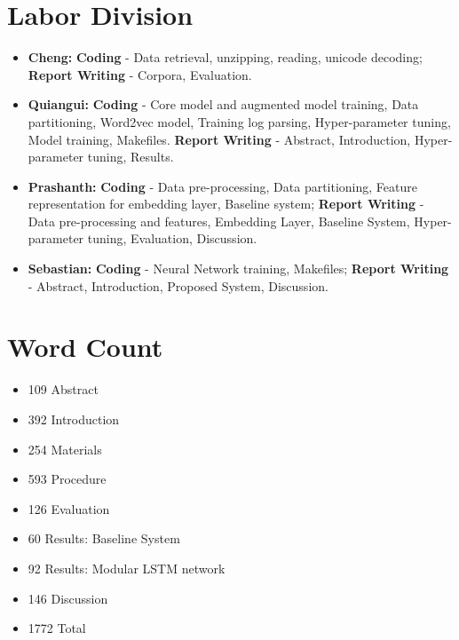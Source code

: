 \documentclass[12pt]{article}
\begin{document}
\newpage
\section{Labor Division}
\begin{itemize}
\item
  \textbf{Cheng:} \textbf{Coding} - Data retrieval, unzipping, reading, unicode decoding; \textbf{Report Writing} - Corpora, Evaluation.
\item
  \textbf{Quiangui:} \textbf{Coding} - Core model and augmented model training, Data partitioning, Word2vec model, Training log parsing, Hyper-parameter tuning, Model training, Makefiles. \textbf{Report Writing} - Abstract, Introduction, Hyper-parameter tuning, Results.
\item
  \textbf{Prashanth:} \textbf{Coding} - Data pre-processing, Data partitioning,  Feature representation for embedding layer, Baseline system; \textbf{Report Writing} - Data pre-processing and features, Embedding Layer, Baseline System, Hyper-parameter tuning, Evaluation, Discussion.
\item
  \textbf{Sebastian:} \textbf{Coding} - Neural Network training, Makefiles; \textbf{Report Writing} - Abstract, Introduction, Proposed System, Discussion.
\end{itemize}
\section{Word Count}
\begin{itemize}
\item
109 Abstract
\item
392 Introduction
\item
254 Materials
\item
593 Procedure
\item
126 Evaluation
\item
60 Results: Baseline System
\item
92 Results: Modular LSTM network
\item
146 Discussion
\item
1772 Total
\end{itemize}
\end{document}
